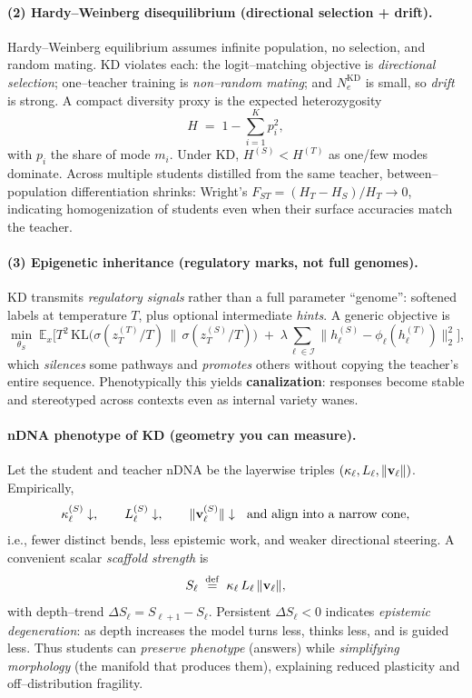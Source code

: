 \paragraph{(2) Hardy–Weinberg disequilibrium (directional selection + drift).}
Hardy–Weinberg equilibrium assumes infinite population, no selection, and random mating. KD violates each: the logit–matching objective is \emph{directional selection}; one–teacher training is \emph{non–random mating}; and $N_e^{\mathrm{KD}}$ is small, so \emph{drift} is strong. A compact diversity proxy is the expected heterozygosity
\[
H \;=\; 1 - \sum_{i=1}^{K} p_i^2,
\]
with $p_i$ the share of mode $m_i$. Under KD, $H^{(S)} < H^{(T)}$ as one/few modes dominate. Across multiple students distilled from the same teacher, between–population differentiation shrinks: Wright's $F_{ST} = (H_T - H_S)/H_T \to 0$, indicating homogenization of students even when their surface accuracies match the teacher.

\paragraph{(3) Epigenetic inheritance (regulatory marks, not full genomes).}
KD transmits \emph{regulatory signals} rather than a full parameter ``genome'': softened labels at temperature $T$, plus optional intermediate \emph{hints}. A generic objective is
\[
\min_{\theta_S}\; \mathbb{E}_{x}\Big[T^2\,\mathrm{KL}\!\big(\sigma(z_T^{(T)}/T)\,\|\,\sigma(z_T^{(S)}/T)\big)\;+\; 
\lambda\!\sum_{\ell\in\mathcal{I}}\!\big\|h^{(S)}_\ell - \phi_\ell(h^{(T)}_\ell)\big\|_2^2\Big],
\]
which \emph{silences} some pathways and \emph{promotes} others without copying the teacher’s entire sequence. Phenotypically this yields \textbf{canalization}: responses become stable and stereotyped across contexts even as internal variety wanes.

\paragraph{nDNA phenotype of KD (geometry you can measure).}
Let the student and teacher nDNA be the layerwise triples $(\kappa_\ell, L_\ell, \|{\bf v}_\ell\|)$. Empirically,
\[
\kappa_\ell^{(S)} \downarrow,\qquad L_\ell^{(S)} \downarrow,\qquad \|{\bf v}_\ell^{(S)}\| \downarrow\ \ \text{and align into a narrow cone,}
\]
i.e., fewer distinct bends, less epistemic work, and weaker directional steering. A convenient scalar \emph{scaffold strength} is
\[
S_\ell \;\stackrel{\mathrm{def}}{=}\; \kappa_\ell\, L_\ell\, \|{\bf v}_\ell\|,
\]
with depth–trend $\Delta S_\ell = S_{\ell+1} - S_\ell$. Persistent $\Delta S_\ell<0$ indicates \emph{epistemic degeneration}: as depth increases the model turns less, thinks less, and is guided less. Thus students can \emph{preserve phenotype} (answers) while \emph{simplifying morphology} (the manifold that produces them), explaining reduced plasticity and off–distribution fragility.

